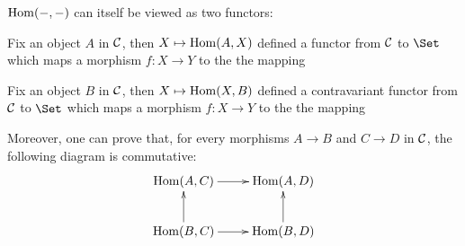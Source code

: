   \begin{exam}\label{exam:hom bifunctor}
    $\operatorname{Hom}(-,-)$ can itself be viewed as two functors:

    Fix an object $A$ in ${\cal C}$, then $X\mapsto\operatorname{Hom}(A,X)$ defined a functor from ${\cal C}$ to $\Set$ which maps a morphism $f\colon X\to Y$ to the the mapping

    Fix an object $B$ in ${\cal C}$, then $X\mapsto\operatorname{Hom}(X,B)$ defined a contravariant functor from ${\cal C}$ to $\Set$ which maps a morphism $f\colon X\to Y$ to the the mapping

    Moreover, one can prove that, for every morphisms $A\to B$ and $C\to D$ in ${\cal C}$, the following diagram is commutative:
    \begin{displaymath}
      \xymatrix{
         \Hom(A,C)\ar[r]&\Hom(A,D)\\
         \Hom(B,C)\ar[r]\ar[u]&\Hom(B,D)\ar[u]
      }
    \end{displaymath}
  \end{exam}

